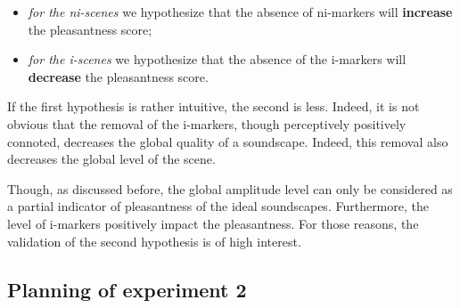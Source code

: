 \documentclass[preprint,12pt]{elsarticle}
\begin{document}

\begin{itemize}
\item \emph{for the ni-scenes} we hypothesize that the absence of ni-markers will \textbf{increase} the pleasantness score;
\item \emph{for the i-scenes} we hypothesize that the absence of the i-markers will \textbf{decrease} the pleasantness score.
\end{itemize}


If the first hypothesis is rather intuitive, the second is less. Indeed, it is not obvious that the removal of the i-markers, though perceptively positively connoted, decreases the global quality of a soundscape. Indeed, this removal also decreases the global level of the scene.


Though, as discussed before, the global amplitude level can only be considered as a partial indicator of pleasantness of the ideal soundscapes. Furthermore, the level of i-markers positively impact the pleasantness. For those reasons, the validation of the second hypothesis is of high interest.

\subsection{Planning of experiment 2}
\end{document}
